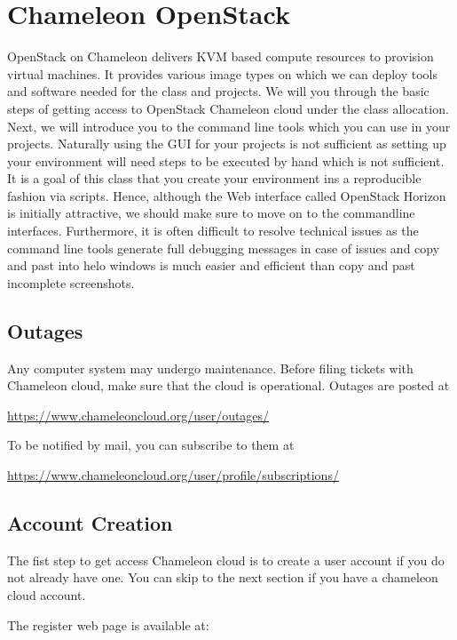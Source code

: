 \section{Chameleon OpenStack}
\label{chameleon-openstack}

OpenStack on Chameleon delivers KVM based compute resources to
provision virtual machines. It provides various image types on
which we can deploy tools and software needed for the class and
projects. We will you through the basic steps of getting access to
OpenStack Chameleon cloud under the class allocation. Next, we will
introduce you to the command line tools which you can use in your
projects. Naturally using the GUI for your projects is not sufficient
as setting up your environment will need steps to be executed by hand
which is not sufficient. It is a goal of this class that you create
your environment ins a reproducible fashion via scripts.  Hence,
although the Web interface called OpenStack Horizon is initially
attractive, we should make sure to move on to the commandline
interfaces.  Furthermore, it is often difficult to resolve technical
issues as the command line tools generate full debugging messages in
case of issues and copy and past into helo windows is much easier and
efficient than copy and past incomplete screenshots.


\subsection{Outages}

Any computer system may undergo maintenance. Before filing tickets
with Chameleon cloud, make sure that the cloud is operational. Outages
are posted at 

\url{https://www.chameleoncloud.org/user/outages/}

To be notified by mail, you can subscribe to them at 

\url{https://www.chameleoncloud.org/user/profile/subscriptions/}

\subsection{Account Creation}

The fist step to get access Chameleon cloud is to create a user
account if you do not already have one. You can skip to the next
section if you have a chameleon cloud account.

The register web page is available at:

